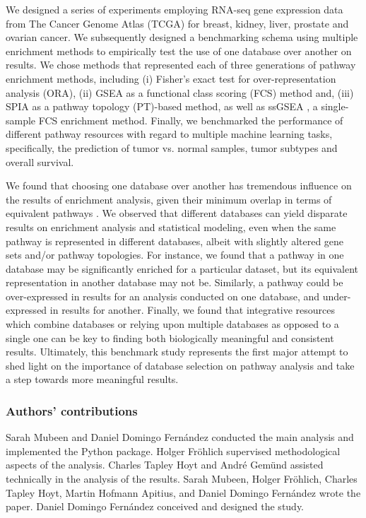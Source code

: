 We designed a series of experiments employing RNA-seq gene expression data from The Cancer Genome Atlas (TCGA) \parencite{weinstein2013} for breast, kidney, liver, prostate and ovarian cancer. We subsequently designed a benchmarking schema using multiple enrichment methods to empirically test the use of one database over another on results. We chose methods that represented each of three generations of pathway enrichment methods, including (i) Fisher's exact test \parencite{fisher1992} for over-representation analysis (ORA), (ii) GSEA \parencite{subramanian2005} as a functional class scoring (FCS) method and, (iii) SPIA \parencite{tarca2009} as a pathway topology (PT)-based method, as well as ssGSEA \parencite{barbie2009}, a single-sample FCS enrichment method. Finally, we benchmarked the performance of different pathway resources with regard to multiple machine learning tasks, specifically, the prediction of tumor vs. normal samples, tumor subtypes and overall survival.

We found that choosing one database over another has tremendous influence on the results of enrichment analysis, given their minimum overlap in terms of equivalent pathways \parencite{domingo2019}. We observed that different databases can yield disparate results on enrichment analysis and statistical modeling, even when the same pathway is represented in different databases, albeit with slightly altered gene sets and/or pathway topologies.  For instance, we found that a pathway in one database may be significantly enriched for a particular dataset, but its equivalent representation in another database may not be. Similarly, a pathway could be over-expressed in results for an analysis conducted on one database, and under-expressed in results for another. Finally, we found that integrative resources which combine databases or relying upon multiple databases as opposed to a single one can be key to finding both biologically meaningful and consistent results. Ultimately, this benchmark study represents the first major attempt to shed light on the importance of database selection on pathway analysis and take a step towards more meaningful results.

\subsubsection{Authors' contributions}

Sarah Mubeen and Daniel Domingo Fernández conducted the main analysis and implemented the Python package. Holger Fröhlich supervised methodological aspects of the analysis. Charles Tapley Hoyt and André Gemünd assisted technically in the analysis of the results. Sarah Mubeen, Holger Fröhlich, Charles Tapley Hoyt, Martin Hofmann Apitius, and Daniel Domingo Fernández wrote the paper. Daniel Domingo Fernández conceived and designed the study.

